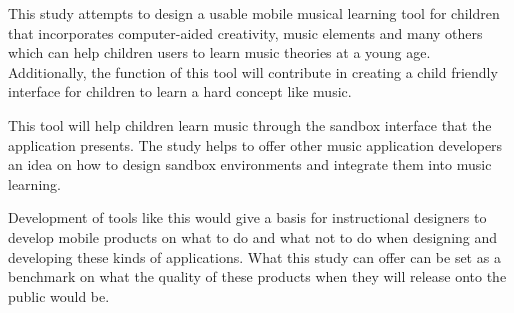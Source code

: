 This study attempts to design a usable mobile musical learning tool for children that incorporates computer-aided creativity, music elements and many others which can help children users to learn music theories at a young age. Additionally, the function of this tool will contribute in creating a child friendly interface for children to learn a hard concept like music. 

This tool will help children learn music through the sandbox interface that the application presents. The study helps to offer other music application developers an idea on how to design sandbox environments and integrate them into music learning.

Development of tools like this would give a basis for instructional designers to develop mobile products on what to do and what not to do when designing and developing these kinds of applications. What this study can offer can be set as a benchmark on what the quality of these products when they will release onto the public would be.

%
%



